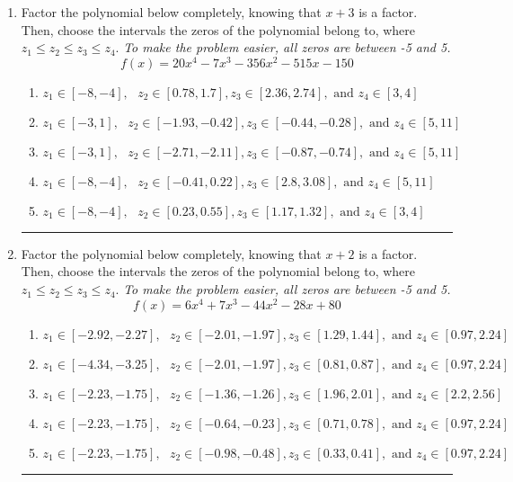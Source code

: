 \documentclass[14pt]{extbook}
\newcommand{\litem}[1]{\item#1\hspace*{-1cm}\rule{\textwidth}{0.4pt}}
\begin{document}
\begin{enumerate}
{\begin{enumerate}[label=\Alph*.]
\end{enumerate} }
\litem{
Factor the polynomial below completely, knowing that $x + 3$ is a factor. Then, choose the intervals the zeros of the polynomial belong to, where $z_1 \leq z_2 \leq z_3 \leq z_4$. \textit{To make the problem easier, all zeros are between -5 and 5.}\[ f(x) = 20x^{4} -7 x^{3} -356 x^{2} -515 x -150 \]\begin{enumerate}[label=\Alph*.]
\item \( z_1 \in [-8, -4], \text{   }  z_2 \in [0.78, 1.7], z_3 \in [2.36, 2.74], \text{   and   } z_4 \in [3, 4] \)
\item \( z_1 \in [-3, 1], \text{   }  z_2 \in [-1.93, -0.42], z_3 \in [-0.44, -0.28], \text{   and   } z_4 \in [5, 11] \)
\item \( z_1 \in [-3, 1], \text{   }  z_2 \in [-2.71, -2.11], z_3 \in [-0.87, -0.74], \text{   and   } z_4 \in [5, 11] \)
\item \( z_1 \in [-8, -4], \text{   }  z_2 \in [-0.41, 0.22], z_3 \in [2.8, 3.08], \text{   and   } z_4 \in [5, 11] \)
\item \( z_1 \in [-8, -4], \text{   }  z_2 \in [0.23, 0.55], z_3 \in [1.17, 1.32], \text{   and   } z_4 \in [3, 4] \)

\end{enumerate} }
\litem{
Factor the polynomial below completely, knowing that $x + 2$ is a factor. Then, choose the intervals the zeros of the polynomial belong to, where $z_1 \leq z_2 \leq z_3 \leq z_4$. \textit{To make the problem easier, all zeros are between -5 and 5.}\[ f(x) = 6x^{4} +7 x^{3} -44 x^{2} -28 x + 80 \]\begin{enumerate}[label=\Alph*.]
\item \( z_1 \in [-2.92, -2.27], \text{   }  z_2 \in [-2.01, -1.97], z_3 \in [1.29, 1.44], \text{   and   } z_4 \in [0.97, 2.24] \)
\item \( z_1 \in [-4.34, -3.25], \text{   }  z_2 \in [-2.01, -1.97], z_3 \in [0.81, 0.87], \text{   and   } z_4 \in [0.97, 2.24] \)
\item \( z_1 \in [-2.23, -1.75], \text{   }  z_2 \in [-1.36, -1.26], z_3 \in [1.96, 2.01], \text{   and   } z_4 \in [2.2, 2.56] \)
\item \( z_1 \in [-2.23, -1.75], \text{   }  z_2 \in [-0.64, -0.23], z_3 \in [0.71, 0.78], \text{   and   } z_4 \in [0.97, 2.24] \)
\item \( z_1 \in [-2.23, -1.75], \text{   }  z_2 \in [-0.98, -0.48], z_3 \in [0.33, 0.41], \text{   and   } z_4 \in [0.97, 2.24] \)


\end{enumerate}}
\end{enumerate}
\end{document}
